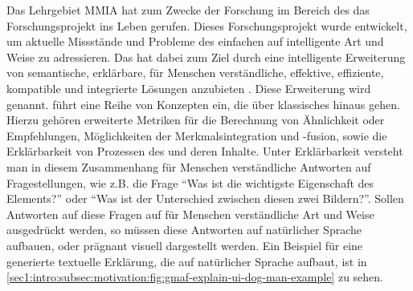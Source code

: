 Das Lehrgebiet MMIA hat zum Zwecke der Forschung im Bereich des \mmir{} das Forschungsprojekt \gmafi{} ins Leben gerufen.
Dieses Forschungsprojekt wurde entwickelt, um aktuelle Missstände und Probleme des einfachen \mmir{} auf intelligente Art und Weise zu adressieren.
Das \gmaf{} hat dabei zum Ziel durch eine intelligente Erweiterung von \mmir{} semantische, erklärbare, für Menschen verständliche, effektive, effiziente, kompatible und integrierte Lösungen anzubieten \cite[S.~20]{swa_diss}.
Diese Erweiterung wird \smmiri{} genannt.
\smmir{} führt eine Reihe von Konzepten ein, die über klassisches \mmir{} hinaus gehen.
Hierzu gehören erweiterte Metriken für die Berechnung von Ähnlichkeit oder Empfehlungen, Möglichkeiten der Merkmalsintegration und -fusion, sowie die Erklärbarkeit von Prozessen des \mmir{} und deren Inhalte.
Unter Erklärbarkeit versteht man in diesem Zusammenhang für Menschen verständliche Antworten auf Fragestellungen, wie z.B. die Frage \enquote{Was ist die wichtigste Eigenschaft des Elements?} oder \enquote{Was ist der Unterschied zwischen diesen zwei Bildern?}.
Sollen Antworten auf diese Fragen auf für Menschen verständliche Art und Weise ausgedrückt werden, so müssen diese Antworten auf natürlicher Sprache aufbauen, oder prägnant visuell dargestellt werden.
Ein Beispiel für eine generierte textuelle Erklärung, die auf natürlicher Sprache aufbaut, ist in \cref{sec1:intro:subsec:motivation:fig:gmaf-explain-ui-dog-man-example} zu sehen.
